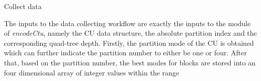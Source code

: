\begin{algorithm}[!t]
{{{    
    \eIf{\iPartNum $\equiv 1$}{
    Create a new csv file, append the value of \uiDepth at the end of the name of the new csv file\;
    \For{$y\leftarrow 0$ \KwTo \uiCuSize}{
    \For{$x\leftarrow 0$ \KwTo \uiCuSize}{
    Write $pOrgPel[x]$ into $row_m$ in csv file\;
    }
    \pOrgPel $\leftarrow$ \pOrgPel + \iStride\;
    }
    Write $iDir[0]$ into the end of $row_m$ in the csv file\;
    }{
    Create a new csv file, append the value of (\uiDepth + $1$) at the end of the name of the new csv file\;
    \sizeOfSubBlk$\leftarrow$\getSizeOfSubBlk{\pcCU, \uiDepth}\;
    \For{$j\leftarrow 0$ \KwTo \iPartNum}{
    \uIf{$j\equiv0$}{
    \yStartPos $\leftarrow 0$
    \& \xStartPos $\leftarrow 0$
    \& \yEndPos $\leftarrow$ \sizeOfSubBlk\
    \& \xEndPos $\leftarrow$ \sizeOfSubBlk\;
    }
    \uElseIf{$j\equiv1$}{
    \yStartPos $\leftarrow 0$
    \& \xStartPos $\leftarrow$ \sizeOfSubBlk
    \& \yEndPos $\leftarrow$ \sizeOfSubBlk
    \& \xEndPos $\leftarrow \sizeOfSubBlk \times 2$\;
    }
    \uElseIf{$j\equiv2$}{
    \yStartPos $\leftarrow$ \sizeOfSubBlk
    \& \xStartPos $\leftarrow 0$
    \& \yEndPos $\leftarrow \sizeOfSubBlk \times 2$
    \& \xEndPos $\leftarrow$ \sizeOfSubBlk\;
    }
    \uElseIf{$j\equiv3$}{
    \yStartPos $\leftarrow$ \sizeOfSubBlk
    \& \xStartPos $\leftarrow$ \sizeOfSubBlk
    \& \yEndPos $\leftarrow \sizeOfSubBlk \times 2$
    \& \xEndPos $\leftarrow \sizeOfSubBlk \times 2$\;
    }
    }
    \For{$y\leftarrow$ \yStartPos \KwTo \yEndPos}{
    \For{$x\leftarrow$ \xStartPos \KwTo \xEndPos}{
    Write $pOrgPel[x]$ into $row_m$ in the csv file\;
    }
    \pOrgPel $\leftarrow$ \pOrgPel+ \iStride\;
    }
    Write $iDir[j]$ into the end of $row_m$ in the csv file\;
    }}}}
 \caption{Collect data}
 \label{algo:collect-data}
\end{algorithm}
The inputs to the data collecting workflow are exactly the inputs to
the module of \emph{encodeCtu}, namely the CU data structure,
the absolute partition index and the corresponding quad-tree depth.
Firstly, the partition mode of the CU is obtained which can further indicate
the partition number to either be one or four.
After that, based on the partition number, the best modes for blocks
are stored into an four dimensional array of integer values within the range
